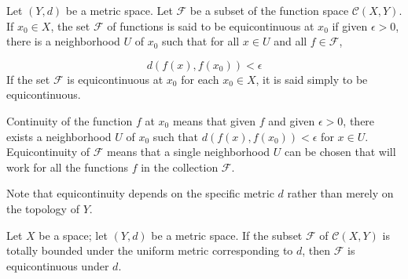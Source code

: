 \begin{definition}
Let \((Y, d)\) be a metric space. Let \(\mathcal{F}\) be a subset of the function space \(\mathcal{C}({X,Y})\). If \(x_{0} \in X\), the set \(\mathcal{F}\) of functions is said to be equicontinuous at \(x_{0}\) if given \(\epsilon > 0\), there is a neighborhood \(U\) of \(x_{0}\) such that for all \(x \in U\) and all \(f \in \mathcal{F}\),

\[
d({f(x),f(x_{0}) }) < \epsilon
\]
If the set \(\mathcal{F}\) is equicontinuous at \(x_{0}\) for each \(x_{0} \in X\), it is said simply to be equicontinuous.
\end{definition}

Continuity of the function \(f\) at \(x_{0}\) means that given \(f\) and given \(\epsilon > 0\), there exists a neighborhood \(U\) of \(x_{0}\) such that \(d({f(x),f(x_{0}) }) < \epsilon\) for \(x \in U\). Equicontinuity of \(\mathcal{F}\) means that a single neighborhood \(U\) can be chosen that will work for all the functions \(f\) in the collection \(\mathcal{F}\).

Note that equicontinuity depends on the specific metric \(d\) rather than merely on the topology of \(Y\).

\begin{lemma}
\label{lem:\thetheorem}
Let \(X\) be a space; let \((Y, d)\) be a metric space. If the subset \(\mathcal{F}\) of \(\mathcal{C}({X,Y})\) is totally bounded under the uniform metric corresponding to \(d\), then \(\mathcal{F}\) is equicontinuous under \(d\).
\end{lemma}

